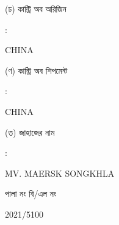 \documentclass[12pt]{article}
\newcommand{\co}{CHINA}
\newcommand{\coship}{CHINA}
\newcommand{\vessel}{MV. MAERSK SONGKHLA}
\newcommand{\rotno}{2021/5100}
\begin{document}
\begin{minipage}[t]{0.45\linewidth}
(ঢ) কান্ট্রি অব অরিজিন
\end{minipage}
\begin{minipage}[t]{0.02\linewidth}
:
\end{minipage}
\begin{minipage}[t]{0.50\linewidth}
{\co}
\\
\end{minipage}
\begin{minipage}[t]{0.05\linewidth}
\hspace*{1em}
\end{minipage}
\begin{minipage}[t]{0.45\linewidth}
(ণ) কান্ট্রি অব শিপমেন্ট
\end{minipage}
\begin{minipage}[t]{0.02\linewidth}
:
\end{minipage}
\begin{minipage}[t]{0.50\linewidth}
{\coship}
\\
\end{minipage}
\begin{minipage}[t]{0.05\linewidth}
\hspace*{1em}
\end{minipage}
\begin{minipage}[t]{0.45\linewidth}
(ত) জাহাজের নাম
\end{minipage}
\begin{minipage}[t]{0.02\linewidth}
:
\end{minipage}
\begin{minipage}[t]{0.50\linewidth}
{\vessel}
\end{minipage}
\begin{minipage}[t]{0.05\linewidth}
\hspace*{1em}
\end{minipage}
\begin{minipage}[t]{0.45\linewidth}
\hspace*{1.8em}পালা নং বি/এল নং
\end{minipage}
\begin{minipage}[t]{0.02\linewidth}
\hspace{1em}
\end{minipage}
\begin{minipage}[t]{0.50\linewidth}
{\rotno}
\\
\end{minipage}
\begin{minipage}[t]{0.05\linewidth}
\hspace*{1em}
\end{minipage}
\end{document}
